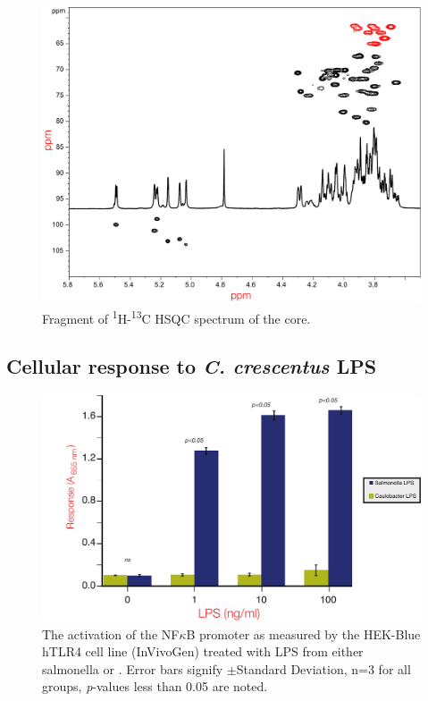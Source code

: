         \begin{figure}[htb]
          \begin{center}
            \includegraphics[width=\textwidth]{lps_chapter/img/lpsfig4.pdf}
          \end{center}
          \caption{Fragment of \textsuperscript{1}H-\textsuperscript{13}C \ac{HSQC} spectrum of the core.}
          \label{fig:lpscorenmr}	
        \end{figure}
        \subsection{Cellular response to \textit{C. crescentus} LPS}\label{sec:cell-resp-text}

        \begin{figure}[htb]
          \begin{center}
            \includegraphics[width=\textwidth]{lps_chapter/img/NFkBAssay.pdf}
          \end{center}
          \caption[NF$\kappa$B Assay for cellular activation by \ac{LPS}]{
            The activation of the NF$\kappa$B promoter as measured by the HEK-Blue hTLR4\texttrademark{} cell line (InVivoGen) treated with \ac{LPS} from either \ac{salmonella} or \caulobacter{}. Error bars signify $\pm{}$Standard Deviation, n=3 for all groups, \textit{p}-values less than 0.05 are noted.  }
          \label{fig:nfkbassay}
        \end{figure}    

